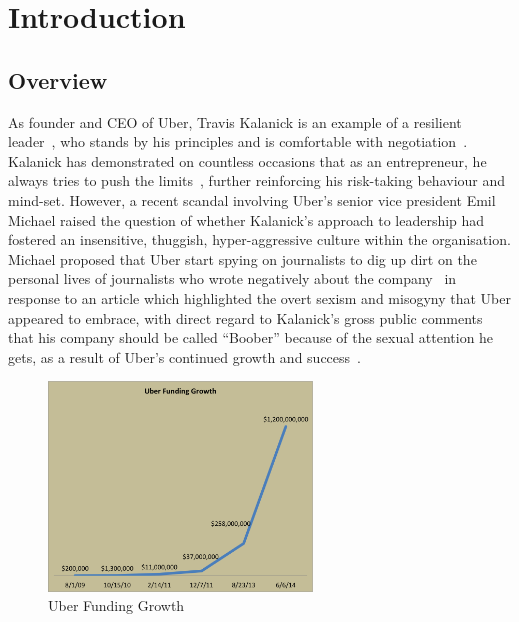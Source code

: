 \chapter{Introduction}

  \section{Overview}

    As founder and CEO of Uber, Travis Kalanick is an example of a resilient leader~\parencite{aib2015}, who stands by his principles and is comfortable with negotiation~\parencite{bhattacharya2015}. Kalanick has demonstrated on countless occasions that as an entrepreneur, he always tries to push the limits~\parencite{smith2014}, further reinforcing his risk-taking behaviour and mind-set. However, a recent scandal involving Uber's senior vice president Emil Michael raised the question of whether Kalanick's approach to leadership had fostered an insensitive, thuggish, hyper-aggressive culture within the organisation. Michael proposed that Uber start spying on journalists to dig up dirt on the personal lives of journalists who wrote negatively about the company~\parencite{withnall2014} in response to an article which highlighted the overt sexism and misogyny that Uber appeared to embrace, with direct regard to Kalanick’s gross public comments that his company should be called ``Boober'' because of the sexual attention he gets, as a result of Uber's continued growth and success~\parencite{lacy2014}. 

    \begin{figure}
      \centering
      \begin{minipage}{7cm}
        \centering
        \includegraphics[width=7cm]{inc/uber_funding_growth.png}
        \caption[Uber Funding Growth]{Uber Funding Growth~\parencite{ferenstein2014}}
        \label{fig:uber_funding_growth}
      \end{minipage}
    \end{figure}

